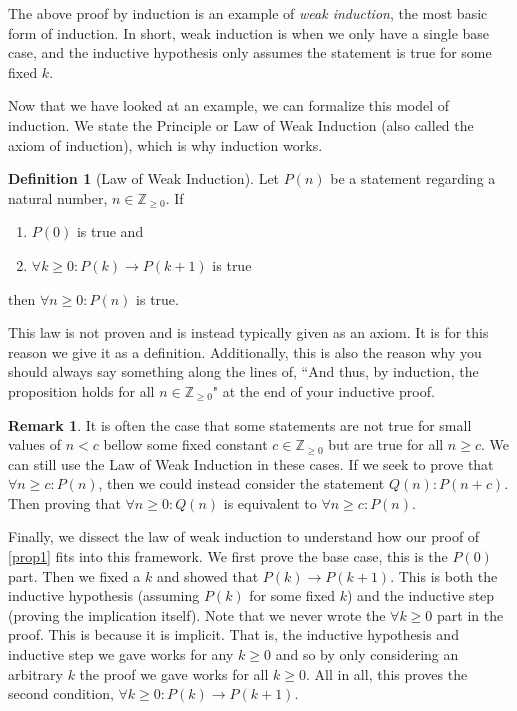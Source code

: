 \documentclass{article}
\newcommand{\ra}{\rightarrow}
\newcommand{\ZZ}{\mathbb{Z}_{\geq 0}}
\theoremstyle{plain}
\theoremstyle{definition}
\newtheorem{definition}{Definition}
\newtheorem{remark}{Remark}
\begin{document}
The above proof by induction is an example of \emph{weak induction}, the most basic form of induction. In short, weak induction is when we only have a single base case, and the inductive hypothesis only assumes the statement is true for some fixed \(k\).

Now that we have looked at an example, we can formalize this model of induction. We state the Principle or Law of Weak Induction (also called the axiom of induction), which is why induction works.

\begin{definition}[Law of Weak Induction]\label{law_of_weak_ind}
    Let \(P(n)\) be a statement regarding a natural number, \(n \in \ZZ\). If 
    \begin{enumerate}
        \item \(P(0)\) is true and
        \item \(\forall k \geq 0 : P(k) \ra P(k+1)\) is true
    \end{enumerate}
    then \(\forall n \geq 0 : P(n)\) is true.
\end{definition}

This law is not proven and is instead typically given as an axiom. It is for this reason we give it as a definition. Additionally, this is also the reason why you should always say something along the lines of, ``And thus, by induction, the proposition holds for all \(n \in \ZZ\)" at the end of your inductive proof. 

\begin{remark}
    It is often the case that some statements are not true for small values of \(n < c\) bellow some fixed constant \(c \in \ZZ\) but are true for all \(n \geq c\). We can still use the Law of Weak Induction in these cases. If we seek to prove that \(\forall n \geq c : P(n)\), then we could instead consider the statement \(Q(n) : P(n + c)\). Then proving that \(\forall n \geq 0: Q(n)\) is equivalent to \(\forall n \geq c : P(n)\).
\end{remark}

\phantom{spacer. I could also use vspace if i wanted to}

Finally, we dissect the law of weak induction to understand how our proof of \cref{prop1} fits into this framework. We first prove the base case, this is the \(P(0)\) part. Then we fixed a \(k\) and showed that \(P(k) \ra P(k+1)\). This is both the inductive hypothesis (assuming \(P(k)\) for some fixed \(k\)) and the inductive step (proving the implication itself). Note that we never wrote the \(\forall k \geq 0\) part in the proof. This is because it is implicit. That is, the inductive hypothesis and inductive step we gave works for any \(k \geq 0\) and so by only considering an arbitrary \(k\) the proof we gave works for all \(k \geq 0\). All in all, this proves the second condition, \(\forall k \geq 0 : P(k) \ra P(k+1)\).
\end{document}
